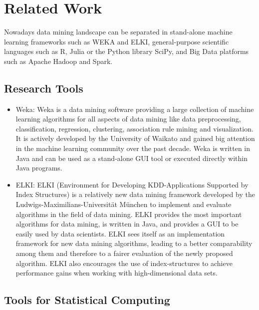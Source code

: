 \chapter{Related Work}\label{chapter:related}

Nowadays data mining landscape can be separated in stand-alone machine learning frameworks such as WEKA and ELKI, general-purpose scientific languages such as R, Julia or the Python library SciPy, and Big Data platforms such as Apache Hadoop and Spark.

\section{Research Tools}
\begin{itemize}
\item Weka: Weka is a data mining software providing a large collection of machine learning algorithms for all aspects of data mining like data preprocessing, classification, regression, clustering, association rule mining and visualization. It is  actively developed by the University of Waikato and gained big attention in the machine learning community over the past decade. Weka is written in Java and can be used as a stand-alone GUI tool or executed directly within Java programs. 

\item ELKI: ELKI (Environment for Developing KDD-Applications Supported by Index Structures) is a relatively new data mining framework developed by the Ludwigs-Maximilians-Universität München to implement and evaluate algorithms in the field of data mining. ELKI provides the most important algorithms for data mining, is written in Java, and provides a GUI to be easily used by data scientists.  ELKI sees itself as an implementation framework for new data mining algorithms, leading to a better comparability among them and therefore to a fairer evaluation of the newly proposed algorithm. ELKI also encourages the use of index-structures to achieve performance gains when working with high-dimensional data sets.

\end{itemize}

\section{Tools for Statistical Computing}


